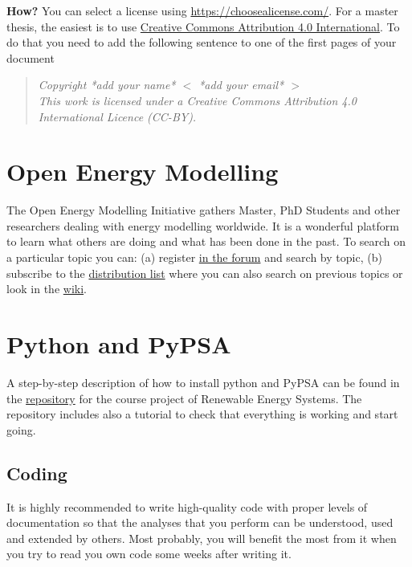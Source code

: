 \documentclass[3p]{elsarticle} %
\begin{document}
\textbf{How?} You can select a license using \href{https://choosealicense.com/}{https://choosealicense.com/}. For a master thesis, the easiest is to use \href{https://creativecommons.org/licenses/by/4.0/}{Creative Commons Attribution 4.0 International}. To do that you need to add the following sentence to one of the first pages of your document
\begin{quote}

\textit{Copyright   *add your name* $<$ *add your email* $>$ \\
This work is licensed under a Creative Commons Attribution 4.0 International Licence (CC-BY).}

\end{quote}



\section{Open Energy Modelling}

The Open Energy Modelling Initiative gathers Master, PhD Students and other researchers dealing with energy modelling worldwide. It is a wonderful platform to learn what others are doing and what has been done in the past. To search on a particular topic you can: (a) register \href{https://forum.openmod-initiative.org/}{in the forum} and search by topic, (b) subscribe to the \href{https://groups.google.com/forum/#!forum/openmod-initiative/home}{distribution list} where you can also search on previous topics or look in the \href{https://wiki.openmod-initiative.org/wiki}{wiki}. 

\section{Python and PyPSA}

A step-by-step description of how to install python and PyPSA can be found in the \href{https://github.com/martavp/RES_project/blob/master/Instructions_RES_project.pdf}{repository} for the course project of Renewable Energy Systems. The repository includes also a tutorial to check that everything is working and start going. 

\subsection{Coding}

It is highly recommended to write high-quality code with proper levels of documentation so that the analyses that you perform can be understood, used and extended by others. Most probably, you will benefit the most from it when you try to read you own code some weeks after writing it. \\
\end{document}
